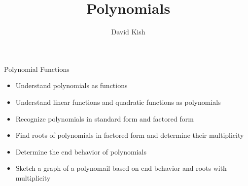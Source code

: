 \documentclass{ximera}
\author{David Kish}
\title{Polynomials}
\begin{document}
\begin{abstract}
\end{abstract}
\maketitle


\begin{objectives}



\item Polynomial Functions
\begin{itemize}
	\item Understand polynomials as functions
	\item Understand linear functions and quadratic functions as polynomials
	\item Recognize polynomials in standard form and factored form
	\item Find roots of polynomials in factored form and determine their multiplicity
	\item Determine the end behavior of polynomials 
	\item Sketch a graph of a polynomail based on end behavior and roots with multiplicity
\end{itemize}

\end{objectives}
\end{document}
